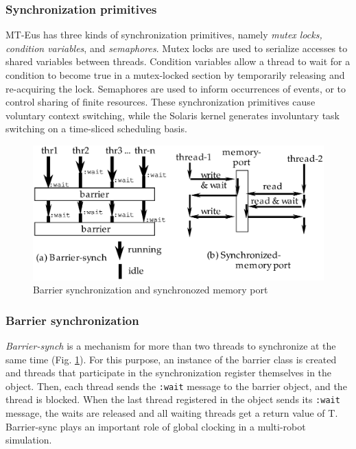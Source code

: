 \subsubsection{Synchronization primitives}
MT-Eus has three kinds of synchronization primitives,
namely {\em mutex locks, condition variables}, and {\em semaphores}.
Mutex locks  are used to serialize accesses to shared variables
between threads.
Condition variables allow a thread to wait for a condition to become
true in a mutex-locked section by temporarily releasing and re-acquiring 
the lock.
Semaphores are used to inform occurrences of events, or to control
sharing of finite resources.
These synchronization primitives cause voluntary context switching,
while the Solaris kernel generates involuntary task switching
on a time-sliced scheduling basis.

\begin{figure}
\begin{center}
\includegraphics[width=130mm]{fig/synchports.ps}
\caption{Barrier synchronization and synchronozed memory port}
\label{synchports}
\end{center}
\end{figure}

\subsubsection{Barrier synchronization}
{\em Barrier-synch} is a mechanism for more than two threads to synchronize
at the same time (Fig. \ref{synchports}).
For this purpose, an instance of the barrier class
is created and threads that participate in
the synchronization register themselves in the object.
Then, each thread sends the {\tt :wait} message to the barrier object,
and the thread is blocked.
When the last thread registered in the object sends its
{\tt :wait} message, the waits are released and all waiting
threads get a return value of T.
Barrier-sync plays an important role of global clocking in a
multi-robot simulation.

